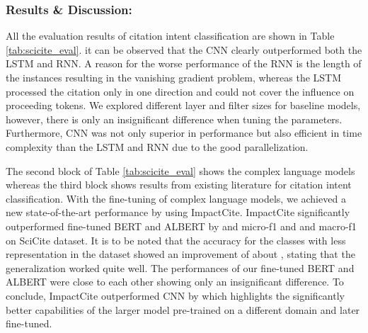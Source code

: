 \documentclass[runningheads]{llncs}
\begin{document}
\subsubsection{Results \& Discussion:}
All the evaluation results of citation intent classification are shown in Table \ref{tab:scicite_eval}. it can be observed that the CNN clearly outperformed both the LSTM and RNN. A reason for the worse performance of the RNN is the length of the instances resulting in the vanishing gradient problem, whereas the LSTM processed the citation only in one direction and could not cover the influence on proceeding tokens. We explored different layer and filter sizes for baseline models, however, there is only an insignificant difference when tuning the parameters. Furthermore, CNN was not only superior in performance but also efficient in time complexity than the LSTM and RNN due to the good parallelization. 

The second block of Table \ref{tab:scicite_eval} shows the complex language models whereas the third block shows results from existing literature for citation intent classification. With the fine-tuning of complex language models, we achieved a new state-of-the-art performance by using ImpactCite. ImpactCite significantly outperformed fine-tuned BERT and ALBERT by  and  micro-f1 and  and  macro-f1 on SciCite dataset. It is to be noted that the accuracy for the classes with less representation in the dataset showed an improvement of about , stating that the generalization worked quite well. The performances of our fine-tuned BERT and ALBERT were close to each other showing only an insignificant difference. To conclude, ImpactCite outperformed CNN by  which highlights the significantly better capabilities of the larger model pre-trained on a different domain and later fine-tuned.
\end{document}
